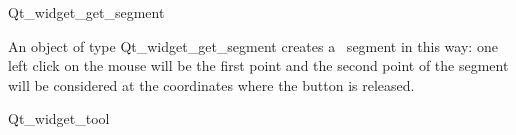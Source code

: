 
\begin{ccRefClass}{Qt_widget_get_segment}

\ccDefinition
An object of type Qt\_widget\_get\_segment creates a \cgal\ segment in this 
way: one left click on the mouse will be the first point and the second point 
of the segment will be considered at the coordinates where the button is 
released.

\ccInheritsFrom
Qt\_widget\_tool

\ccGlue

\ccCreation
{}


\end{ccRefClass}








